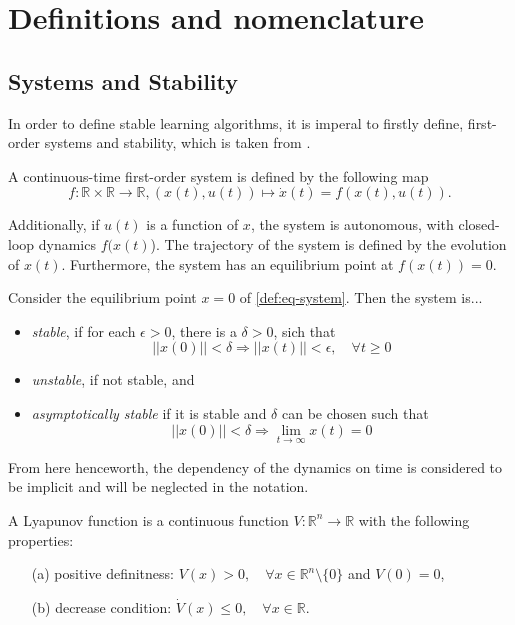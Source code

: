 \section{Definitions and nomenclature}

\subsection{Systems and Stability}
In order to define stable learning algorithms, it is imperal to firstly define, first-order systems and stability, which is taken from \cite{khalilNonlinearSystems1996}.

\begin{definition}[System]
    A continuous-time first-order system is defined by the following map
    \begin{equation}
        f:\mathbb{R}\times\mathbb{R}\rightarrow \mathbb{R}, (x(t),u(t)) \mapsto \dot x(t) = f(x(t),u(t)).
        \label{def:eq-system}
    \end{equation}

    Additionally, if $u(t)$ is a function of $x$, the system is autonomous, with closed-loop dynamics $f(x(t)$). The trajectory of the system is defined by the evolution of $x(t)$. Furthermore, the system has an equilibrium point at $f(x(t))=0$.
    \label{def:system}
\end{definition}

\begin{definition}[Stability]
    Consider the equilibrium point $x=0$ of \eqref{def:eq-system}. Then the system is... 
    \begin{itemize}
        \item \textit{stable}, if for each $\epsilon>0$, there is a $\delta>0$, sich that
            $$||x(0)||<\delta \Rightarrow ||x(t)||<\epsilon, \quad \forall t \geq 0$$ 
        \item \textit{unstable}, if not stable, and
        \item \textit{asymptotically stable} if it is stable and $\delta$ can be chosen such that
            $$||x(0)||<\delta \Rightarrow \lim_{t\rightarrow\infty} x(t)=0 $$
    \end{itemize} 
\end{definition}
From here henceworth, the dependency of the dynamics on time is considered to be implicit and will be neglected in the notation.


\begin{definition}
    A Lyapunov function is a continuous function $V: \mathbb{R}^n\rightarrow\mathbb{R}$ with the following properties:
    \begin{enumerate}
        \item[(a)] positive definitness: $V(x)>0, \quad \forall x\in\mathbb{R}^n\setminus\{0\}$ and $V(0)=0$,
        \item[(b)] decrease condition: $\dot V(x)\leq0, \quad \forall x\in\mathbb{R}$.
    \end{enumerate}
\end{definition}

